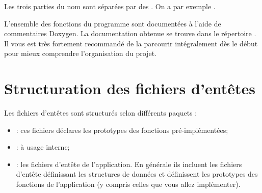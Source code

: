Les trois parties du nom sont séparées par des \ccode{_}. On a par exemple
.

L'ensemble des fonctions du programme sont documentées à l'aide de commentaires
Doxygen. La documentation obtenue se trouve dans le répertoire . Il vous est très fortement recommandé de la parcourir intégralement dès le début pour mieux comprendre l'organisation du projet.

\section{Structuration des fichiers d'entêtes}

Les fichiers d'entêtes sont structurés selon différents paquets :
\begin{itemize}
  \item {} : ces fichiers déclares les prototypes des
  fonctions pré-implémentées;
  \item {} : à usage interne;
  \item {} : les fichiers d'entête de l'application. En générale
  ils incluent les fichiers d'entête définissant les structures de données et
  définissent les prototypes des fonctions de l'application (y compris celles
  que vous allez implémenter).
\end{itemize}
















 
